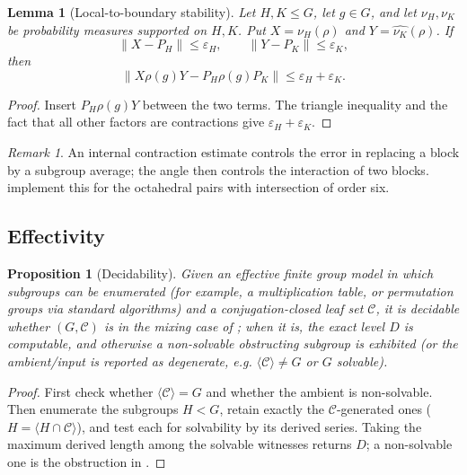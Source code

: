 \documentclass[11pt]{amsart}
\newtheorem{lemma}[lemma]{Lemma}
\newtheorem{proposition}[proposition]{Proposition}
\theoremstyle{definition}
\theoremstyle{remark}
\newtheorem{remark}[remark]{Remark}
\theoremstyle{plain}
\theoremstyle{plain}
\numberwithin{equation}{section}
\newcommand{\norm}[1]{\lVert #1 \rVert}
\newcommand{\opn}[1]{\norm{#1}}
\begin{document}
\begin{lemma}[Local-to-boundary stability]
\label{lem:local-boundary-stability}
Let $H,K\le G$, let $g\in G$, and let $\nu_H,\nu_K$ be probability measures supported on $H,K$.
Put $X=\widehat{\nu_H}(\rho)$ and $Y=\widehat{\nu_K}(\rho)$. If
\[
  \opn{X-P_H}\le\varepsilon_H,
  \qquad
  \opn{Y-P_K}\le\varepsilon_K,
\]
then
\[
  \opn{X\rho(g)Y-P_H\rho(g)P_K}\le\varepsilon_H+\varepsilon_K .
\]
\end{lemma}

\begin{proof}
Insert $P_H\rho(g)Y$ between the two terms.
The triangle inequality and the fact that all other factors are contractions
give $\varepsilon_H+\varepsilon_K$.
\end{proof}

\begin{remark}
An internal contraction estimate controls the error in replacing a block
by a subgroup average; the angle then controls the interaction of two
blocks.  implement this
for the octahedral pairs with intersection of order six.
\end{remark}

\subsection{Effectivity}

\begin{proposition}[Decidability]
\label{prop:algorithm}
Given an effective finite group model in which subgroups can be enumerated (for example, a
multiplication table, or permutation groups via standard algorithms) and a conjugation-closed leaf
set $\mathcal C$, it is decidable whether $(G,\mathcal C)$ is in the mixing case of
; when it is, the exact level $D$ is computable, and otherwise a non-solvable
obstructing subgroup is exhibited (or the ambient/input is reported as degenerate, e.g.
$\langle\mathcal C\rangle\neq G$ or $G$ solvable).
\end{proposition}
\begin{proof}
First check whether $\langle\mathcal C\rangle=G$ and whether the ambient is non-solvable. Then
enumerate the subgroups $H<G$, retain exactly the $\mathcal C$-generated ones
($H=\langle H\cap\mathcal C\rangle$), and test each for solvability by its derived series. Taking
the maximum derived length among the solvable witnesses returns $D$; a non-solvable one is the
obstruction in .
\end{proof}
\end{document}
